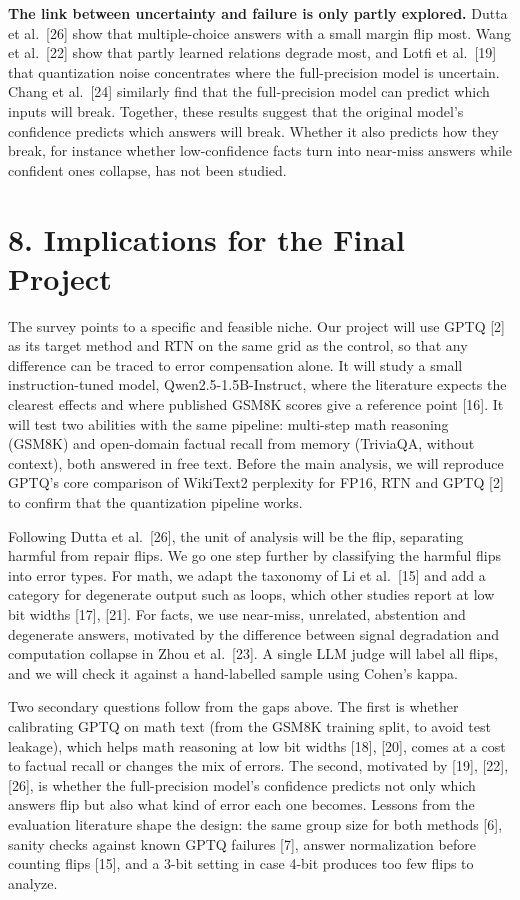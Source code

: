 \documentclass[10pt,twocolumn]{article}
\begin{document}
\textbf{The link between uncertainty and failure is only partly
explored.} Dutta et al.~[26] show that multiple-choice answers with a
small margin flip most. Wang et al.~[22] show that partly learned
relations degrade most, and Lotfi et al.~[19] that quantization noise
concentrates where the full-precision model is uncertain. Chang et
al.~[24] similarly find that the full-precision model can predict which
inputs will break. Together, these results suggest that the original
model's confidence predicts which answers will break. Whether it also
predicts how they break, for instance whether low-confidence facts turn
into near-miss answers while confident ones collapse, has not been
studied.

\section{8. Implications for the Final Project}

The survey points to a specific and feasible niche. Our project will use
GPTQ [2] as its target method and RTN on the same grid as the control,
so that any difference can be traced to error compensation alone. It
will study a small instruction-tuned model, Qwen2.5-1.5B-Instruct,
where the literature expects the clearest effects and where published
GSM8K scores give a reference point [16]. It will test two abilities
with the same pipeline: multi-step math reasoning (GSM8K) and
open-domain factual recall from memory (TriviaQA, without context), both
answered in free text. Before the main analysis, we will reproduce
GPTQ's core comparison of WikiText2 perplexity for FP16, RTN and GPTQ
[2] to confirm that the quantization pipeline works.

Following Dutta et al.~[26], the unit of analysis will be the flip,
separating harmful from repair flips. We go one step further by
classifying the harmful flips into error types. For math, we adapt the
taxonomy of Li et al.~[15] and add a category for degenerate output such
as loops, which other studies report at low bit widths [17], [21]. For
facts, we use near-miss, unrelated, abstention and degenerate answers,
motivated by the difference between signal degradation and computation
collapse in Zhou et al.~[23]. A single LLM judge will label all flips,
and we will check it against a hand-labelled sample using Cohen's kappa.

Two secondary questions follow from the gaps above. The first is whether
calibrating GPTQ on math text (from the GSM8K training split, to avoid
test leakage), which helps math reasoning at low bit widths [18], [20],
comes at a cost to factual recall or changes the mix of errors. The
second, motivated by [19], [22], [26], is whether the full-precision
model's confidence predicts not only which answers flip but also what
kind of error each one becomes. Lessons from the evaluation literature
shape the design: the same group size for both methods [6], sanity
checks against known GPTQ failures [7], answer normalization before
counting flips [15], and a 3-bit setting in case 4-bit produces too few
flips to analyze.
\end{document}
